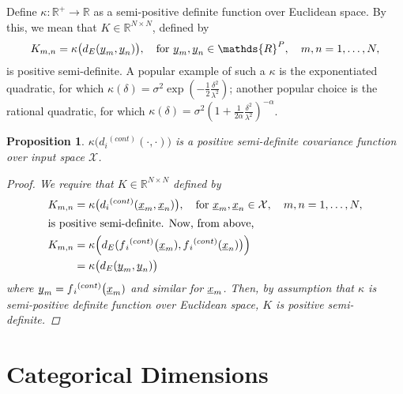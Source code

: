 \documentclass[letterpaper]{article}
\newcommand{\vect}[1]{\underline{\smash{#1}}}
\renewcommand{\v}[1]{\vect{#1}}
\newcommand{\reals}{\mathds{R}}
\newtheorem{prop}[thm]{Proposition}
\begin{document}
Define $\kappa\colon \reals^+ \to \reals$ as a semi-positive definite function over Euclidean space. By this, we mean that $K \in \reals^{N\times N}$, defined by 
\begin{equation}
 K_{m, n} = \kappa\bigl(d_E(\v{y}_m, \v{y}_n)\bigr),\quad \text{for }
\v{y}_m, \v{y}_n \in \reals^P,\quad m, n = 1, \ldots, N, 
\end{equation}
is positive semi-definite. A popular example of such a $\kappa$ is the exponentiated quadratic, for which $\kappa(\delta) = \sigma^2 \exp(-\frac{1}{2} \frac{\delta^2}{\lambda^2})$; another popular choice is the rational quadratic, for which $\kappa(\delta) = \sigma^2 (1+\frac{1}{2\alpha} \frac{\delta^2}{\lambda^2})^{-\alpha}$.

\begin{prop}
  $\kappa\bigl(d{_i}^{(cont)}(\cdot,\cdot)\bigr)$ is a positive semi-definite covariance function over input space $\mathcal{X}$. 
\label{prop:cont_psd_proof}
\begin{proof}
We require that $K \in \reals^{N\times N}$ defined by
\begin{align*}
 K_{m, n} & = \kappa\bigl(d{_i}^{(cont)}(\v{x}_m,\v{x}_n)\bigr)
,\quad \text{for }
\v{x}_m, \v{x}_n \in \mathcal{X},\quad m, n = 1, \ldots, N, 
\\
\intertext{is positive semi-definite. Now, from above,}
K_{m, n} & = \kappa\Bigl(d_E(f{_i}^{(cont)}\bigl(\v{x}_m), f{_i}^{(cont)}(\v{x}_n)\bigr)\Bigr) \\
& = \kappa\bigl(d_E(\v{y}_m, \v{y}_n)\bigr)
\end{align*}
where $\v{y}_m = f{_i}^{(cont)}\bigl(\v{x}_m)$ and similar for $\v{x}_m$. Then, by assumption that $\kappa$ is semi-positive definite function over Euclidean space, $K$ is positive semi-definite. 
\end{proof}
\end{prop}



\section{Categorical Dimensions}
\end{document}
